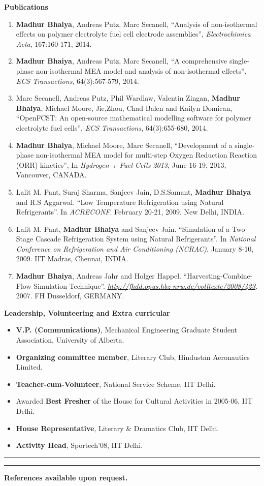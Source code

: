 \documentclass[letterpaper,11pt]{article}
\newcommand{\resitem}[1]{\item #1 \vspace{-2pt}}
\newcommand{\resheading}[1]{{\large \colorbox{mygrey}{\begin{minipage}{\textwidth}{\textbf{#1 \vphantom{p\^{E}}}}\end{minipage}}}}
\begin{document}
\resheading{Publications}
\begin{enumerate}
	\resitem{{\small \textbf{Madhur Bhaiya}, Andreas Putz, Marc Secanell, ``Analysis of non-isothermal effects on polymer electrolyte fuel cell electrode assemblies'', {\it Electrochimica Acta}, 167:160-171, 2014.}}

	\resitem{{\small \textbf{Madhur Bhaiya}, Andreas Putz, Marc Secanell, ``A comprehensive single-phase non-isothermal MEA model and analysis of non-isothermal effects'', {\it ECS Transactions}, 64(3):567-579, 2014.}}

	\resitem{{\small Marc Secanell, Andreas Putz, Phil Wardlaw, Valentin Zingan, \textbf{Madhur Bhaiya}, Michael Moore, Jie,Zhou, Chad Balen and Kailyn Domican, ``OpenFCST: An open-source mathematical modelling software for polymer electrolyte fuel cells'', {\it ECS Transactions}, 64(3):655-680, 2014.}}

	\resitem{{\small \textbf{Madhur Bhaiya}, Michael Moore, Marc Secanell, ``Development of a single-phase non-isothermal MEA model for multi-step
				Oxygen Reduction Reaction (ORR) kinetics'', In {\it Hydrogen + Fuel Cells 2013}, June 16-19, 2013, Vancouver, CANADA.}}

	\resitem{{\small Lalit M. Pant, Suraj Sharma, Sanjeev Jain, D.S.Samant, \textbf{Madhur Bhaiya} and R.S Aggarwal.  ``Low Temperature Refrigeration using Natural Refrigerants''.  In {\it ACRECONF}.  February 20-21, 2009. New Delhi, INDIA. }}

	\resitem{{\small Lalit M. Pant, \textbf{Madhur Bhaiya} and Sanjeev Jain.  ``Simulation of a Two Stage Cascade Refrigeration System using Natural Refrigerants''. In {\it National Conference on Refrigeration and Air Conditioning (NCRAC)}. January 8-10, 2009. IIT Madras, Chennai, INDIA. }}

	\resitem{{\small \textbf{Madhur Bhaiya}, Andreas Jahr and Holger Happel.  ``Harvesting-Combine-Flow Simulation Technique''. \href{http://fhdd.opus.hbz-nrw.de/volltexte/2008/423}{ {\it http://fhdd.opus.hbz-nrw.de/volltexte/2008/423}}. 2007. FH Dusseldorf, GERMANY. }}
\end{enumerate}

\resheading{Leadership, Volunteering and Extra curricular}
\begin{itemize}
	\item \textbf{V.P. (Communications)}, Mechanical Engineering Graduate Student Association, University of Alberta.
	\item \textbf{Organizing committee member}, Literary Club, Hindustan Aeronautics Limited.
	\item \textbf{Teacher-cum-Volunteer}, National Service Scheme, IIT Delhi.
	\item Awarded \textbf{Best Fresher} of the House for Cultural Activities in 2005-06, IIT Delhi.
	\item \textbf{House Representative}, Literary \& Dramatics Club, IIT Delhi.
	\item \textbf{Activity Head}, Sportech'08, IIT Delhi.
\end{itemize}
\vspace{4pt}\hrule\vspace{2pt}\hrule\vspace{4pt}

\centerline{\textbf{References available upon request.}}
\end{document}
